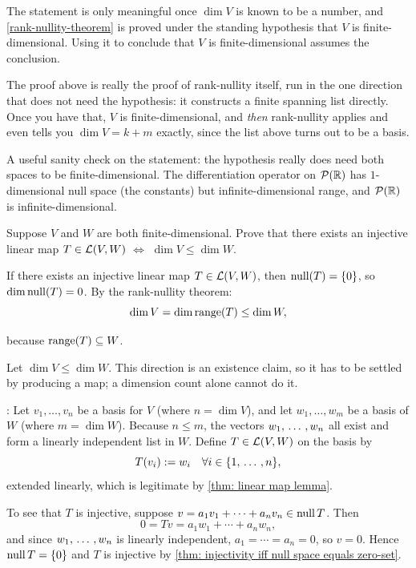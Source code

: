 \begin{ainote}
  The statement  is only meaningful once $\dim V$ is known to be a number, and \ref{rank-nullity-theorem} is proved under the standing hypothesis that $V$ is finite-dimensional. Using it to conclude that $V$ is finite-dimensional assumes the conclusion.

  The proof above is really the proof of rank-nullity itself, run in the one direction that does not need the hypothesis: it constructs a finite spanning list directly. Once you have that, $V$ is finite-dimensional, and \emph{then} rank-nullity applies and even tells you $\dim V = k + m$ exactly, since the list above turns out to be a basis.

  A useful sanity check on the statement: the hypothesis really does need both spaces to be finite-dimensional. The differentiation operator on $\mathcal{P}(\mathbb{R})$ has $1$-dimensional null space (the constants) but infinite-dimensional range, and $\mathcal{P}(\mathbb{R})$ is infinite-dimensional.
\end{ainote}

\begin{xrcs}
  Suppose $V$ and $W$ are both finite-dimensional. Prove that there exists an injective linear map $T \in \mathcal{L}(V,W)$ $\iff$ $\dim V \leq \dim W$.

  \begin{xprf}
    \Rightarrowdirection If there exists an injective linear map $T \in \mathcal{L}(V,W)$, then $\operatorname{null}(T) = \{0\}$, so $\dim \operatorname{null}(T) = 0$. By the rank-nullity theorem:
    \begin{equation}
      \dim V = \dim \operatorname{range}(T) \leq \dim W,
    \end{equation}

    because $ \operatorname{range}(T) \subseteq W$.

    \Leftarrowdirection Let $\dim V \leq \dim W$. This direction is an existence claim, so it has to be settled by producing a map; a dimension count alone cannot do it.

    :
    Let $v_1, \dots, v_n$ be a basis for $V$ (where $n = \dim V$), and let $w_1, \dots, w_m$ be a basis of $W$ (where $m = \dim W$). Because $n \leq m$, the vectors $w_1, {\, \ldots \,\,}, w_n$ all exist and form a linearly independent list in $W$. Define $T \in \mathcal{L}(V,W)$ on the basis by
    \begin{equation}
      T(v_i) := w_i \quad \forall i \in \{1, {\, \ldots \,\,}, n\},
    \end{equation}
    extended linearly, which is legitimate by \ref{thm: linear map lemma}.

    To see that $T$ is injective, suppose $v = a_1 v_1 + \cdots + a_n v_n \in \operatorname{null} T$. Then
    \begin{equation}
      0 = Tv = a_1 w_1 + \cdots + a_n w_n,
    \end{equation}
    and since $w_1, {\, \ldots \,\,}, w_n$ is linearly independent, $a_1 = \cdots = a_n = 0$, so $v = 0$. Hence $\operatorname{null} T = \{0\}$ and $T$ is injective by \ref{thm: injectivity iff null space equals zero-set}.
  \end{xprf}
\end{xrcs}

